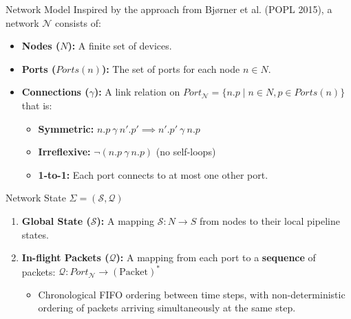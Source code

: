 \documentclass[aspectratio=169]{beamer}
\begin{document}
\begin{hidden}
\begin{frame}{Network Model}
       \small
       Inspired by the approach from Bjørner et al. (POPL 2015), a network
      $\mathcal{N}$ consists of:
       
       \begin{itemize}
         \item \textbf{Nodes ($N$):} A finite set of devices.
         \item \textbf{Ports ($Ports(n)$):} The set of ports for each node $n
      \in N$.
         \item \textbf{Connections ($\gamma$):} A link relation on
      $Port_\mathcal{N} = \{n.p \mid n \in N, p \in Ports(n)\}$ that is:
         \begin{itemize}
          \item \textbf{Symmetric:} $n.p \ \gamma \ n'.p' \implies n'.p' \
      \gamma \ n.p$
          \item \textbf{Irreflexive:} $\neg(n.p \ \gamma \ n.p)$ (no
      self-loops)
          \item \textbf{1-to-1:} Each port connects to at most one other port.
        \end{itemize}
      \end{itemize}
   
      \pause
      \begin{block}{Network State $\Sigma = (\mathcal{S}, \mathcal{Q})$}
        \begin{enumerate}
          \item \textbf{Global State ($\mathcal{S}$):} A mapping $\mathcal{S}
      : N \to S$ from nodes to their local pipeline states.
          \item \textbf{In-flight Packets ($\mathcal{Q}$):} A mapping from
      each port to a \textbf{sequence} of packets:
         $ \mathcal{Q} : Port_\mathcal{N} \to
      (\text{Packet})^* $
          \begin{itemize}
            \item Chronological FIFO ordering between time steps, with non-deterministic ordering of
      packets arriving simultaneously at the same step.
          \end{itemize}
        \end{enumerate}
      \end{block}
\end{frame}


\end{hidden}
\end{document}
